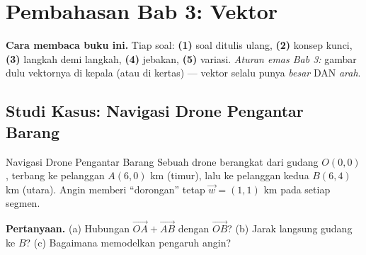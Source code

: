 
\renewcommand{\babjudul}{Pembahasan Latihan — Bab 3}


\setcounter{chapter}{3}

\chapter*{Pembahasan Bab 3: Vektor}

\begin{tips}
\textbf{Cara membaca buku ini.} Tiap soal: \textbf{(1)} soal ditulis ulang,
\textbf{(2)} konsep kunci, \textbf{(3)} langkah demi langkah, \textbf{(4)}
jebakan, \textbf{(5)} variasi. \emph{Aturan emas Bab 3:} gambar dulu vektornya
di kepala (atau di kertas) --- vektor selalu punya \emph{besar} DAN \emph{arah}.
\end{tips}

\section*{Studi Kasus: Navigasi Drone Pengantar Barang}

\begin{studikasus}{Navigasi Drone Pengantar Barang}
Sebuah drone berangkat dari gudang $O(0,0)$, terbang ke pelanggan $A(6,0)$ km
(timur), lalu ke pelanggan kedua $B(6,4)$ km (utara). Angin memberi ``dorongan''
tetap $\vec w=(1,1)$ km pada setiap segmen.
\begin{center}
\end{center}
\textbf{Pertanyaan.} (a) Hubungan $\vec{OA}+\vec{AB}$ dengan $\vec{OB}$?
(b) Jarak langsung gudang ke $B$? (c) Bagaimana memodelkan pengaruh angin?
\end{studikasus}

